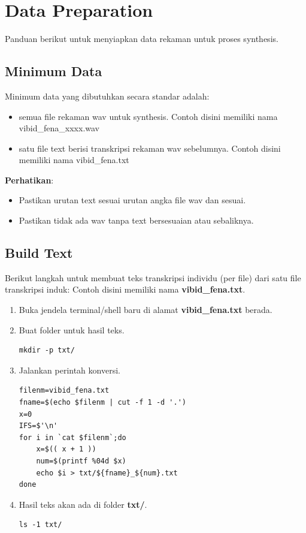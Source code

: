 \documentclass[12pt,]{article}
\begin{document}
	\newpage
	\section{Data Preparation}
	
	Panduan berikut untuk menyiapkan data rekaman untuk proses synthesis.
	
	\subsection{Minimum Data}
	
	Minimum data yang dibutuhkan secara standar adalah:
	\begin{itemize}
		\item semua file rekaman wav untuk synthesis. 
		Contoh disini memiliki nama vibid\_fena\_xxxx.wav
		
		\item satu file text berisi transkripsi rekaman wav sebelumnya.
		Contoh disini memiliki nama vibid\_fena.txt
	\end{itemize}

	\textbf{Perhatikan}:
	\begin{itemize}
		\item Pastikan urutan text sesuai urutan angka file wav dan sesuai.
		\item Pastikan tidak ada wav tanpa text bersesuaian atau sebaliknya.
	\end{itemize}

	\subsection{Build Text}
	
	Berikut langkah untuk membuat teks transkripsi individu (per file) dari satu file transkripsi induk:
	Contoh disini memiliki nama \textbf{vibid\_fena.txt}.
	\begin{enumerate}
		\item Buka jendela terminal/shell baru di alamat \textbf{vibid\_fena.txt} berada.
		
		\item Buat folder untuk hasil teks.
		\begin{verbatim}
mkdir -p txt/
		\end{verbatim}

		\item Jalankan perintah konversi.
		\begin{verbatim}
filenm=vibid_fena.txt
fname=$(echo $filenm | cut -f 1 -d '.')
x=0
IFS=$'\n'
for i in `cat $filenm`;do
	x=$(( x + 1 ))
	num=$(printf %04d $x)
	echo $i > txt/${fname}_${num}.txt
done
		\end{verbatim}
		
		\item Hasil teks akan ada di folder \textbf{txt/}.
		\begin{verbatim}
ls -1 txt/
		\end{verbatim}
		
	\end{enumerate}
\end{document}

